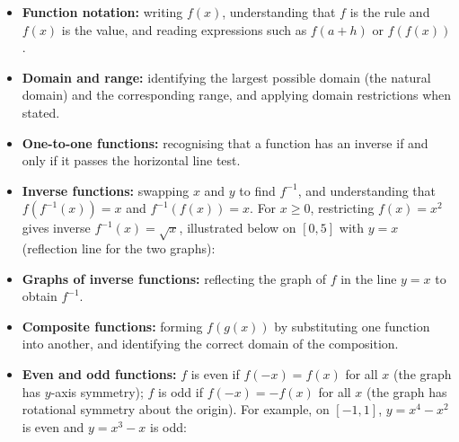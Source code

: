 \documentclass[12pt]{article}
\theoremstyle{definition}
\begin{document}
\begin{itemize}[leftmargin=*]
  \item \textbf{Function notation:} writing $f(x)$, understanding that $f$ is the rule and $f(x)$ is the value, and reading expressions such as $f(a+h)$ or $f(f(x))$.
  \item \textbf{Domain and range:} identifying the largest possible domain (the natural domain) and the corresponding range, and applying domain restrictions when stated.
  \item \textbf{One-to-one functions:} recognising that a function has an inverse if and only if it passes the horizontal line test.
  \item \textbf{Inverse functions:} swapping $x$ and $y$ to find $f^{-1}$, and understanding that $f(f^{-1}(x))=x$ and $f^{-1}(f(x))=x$. For $x\ge 0$, restricting $f(x)=x^2$ gives inverse $f^{-1}(x)=\sqrt{x}$, illustrated below on $[0,5]$ with $y=x$ (reflection line for the two graphs):
  \begin{center}
  \end{center}
  \item \textbf{Graphs of inverse functions:} reflecting the graph of $f$ in the line $y=x$ to obtain $f^{-1}$.
  \item \textbf{Composite functions:} forming $f(g(x))$ by substituting one function into another, and identifying the correct domain of the composition.
  \item \textbf{Even and odd functions:} $f$ is even if $f(-x)=f(x)$ for all $x$ (the graph has $y$-axis symmetry); $f$ is odd if $f(-x)=-f(x)$ for all $x$ (the graph has rotational symmetry about the origin). For example, on $[-1,1]$, $y=x^4-x^2$ is even and $y=x^3-x$ is odd:

\end{itemize}
\end{document}

